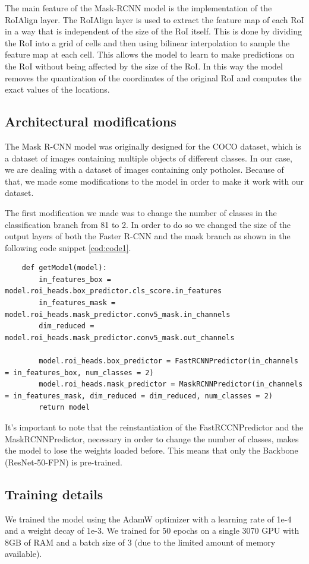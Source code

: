 The main feature of the Mask-RCNN model is the implementation of the RoIAlign layer. The RoIAlign layer is used to extract the feature map of each RoI in a way that is independent of the size of the RoI itself. This is done by dividing the RoI into a grid of cells and then using bilinear interpolation to sample the feature map at each cell. This allows the model to learn to make predictions on the RoI without being affected by the size of the RoI.
In this way the model removes the quantization of the coordinates of the original RoI and computes the exact values of the locations.


\subsection{Architectural modifications}
The Mask R-CNN model was originally designed for the COCO dataset, which is a dataset of images containing multiple objects of different classes. In our case, we are dealing with a dataset of images containing only potholes. Because of that, we made some modifications to the model in order to make it work with our dataset.

The first modification we made was to change the number of classes in the classification branch from 81 to 2. In order to do so we changed the size of the output layers of both the Faster R-CNN and the mask branch as shown in the following code snippet \ref{cod:code1}.

\label{cod:code1}
\begin{lstlisting}
    def getModel(model):
        in_features_box = model.roi_heads.box_predictor.cls_score.in_features
        in_features_mask = model.roi_heads.mask_predictor.conv5_mask.in_channels
        dim_reduced = model.roi_heads.mask_predictor.conv5_mask.out_channels

        model.roi_heads.box_predictor = FastRCNNPredictor(in_channels = in_features_box, num_classes = 2)
        model.roi_heads.mask_predictor = MaskRCNNPredictor(in_channels = in_features_mask, dim_reduced = dim_reduced, num_classes = 2)
        return model
\end{lstlisting}

It's important to note that the reinstantiation of the FastRCCNPredictor and the MaskRCNNPredictor, necessary in order to change the number of classes, makes the model to lose the weights loaded before. This means that only the Backbone (ResNet-50-FPN) is pre-trained.


\subsection{Training details}
We trained the model using the AdamW optimizer with a learning rate of 1e-4 and a weight decay of 1e-3. We trained for 50 epochs on a single 3070 GPU with 8GB of RAM and a batch size of 3 (due to the limited amount of memory available).

